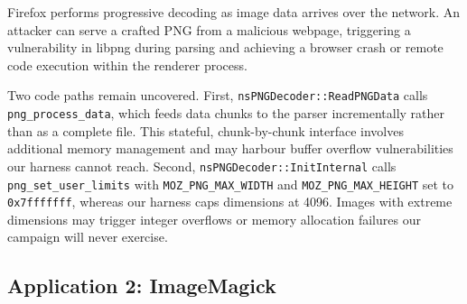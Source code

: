 \documentclass[letterpaper,twocolumn,10pt]{article}
\begin{document}
Firefox performs progressive decoding as image data arrives over the network. An attacker can serve a crafted PNG from a malicious webpage, triggering a vulnerability in libpng during parsing and achieving a browser crash or remote code execution within the renderer process.

Two code paths remain uncovered. First, \lstinline|nsPNGDecoder::ReadPNGData| calls \lstinline|png_process_data|, which feeds data chunks
to the parser incrementally rather than as a complete file. This stateful, chunk-by-chunk interface involves additional memory management and may harbour buffer overflow vulnerabilities our harness cannot reach. Second, \lstinline|nsPNGDecoder::InitInternal| calls \lstinline|png_set_user_limits| with \lstinline|MOZ_PNG_MAX_WIDTH| and \lstinline|MOZ_PNG_MAX_HEIGHT| set to \lstinline|0x7fffffff|, whereas our harness caps dimensions at 4096. Images with extreme dimensions may trigger integer overflows or memory allocation failures our campaign will never exercise.

\subsection{Application 2: ImageMagick}


\end{document}
